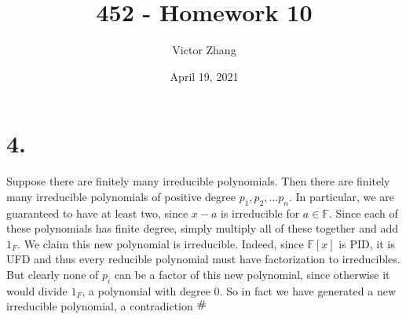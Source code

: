 \documentclass{article}
\title{452 - Homework 10}
\author{Victor Zhang}
\date{April 19, 2021}
\newcommand{\contra}{\raisebox{\depth}{\#}}
\begin{document}
\maketitle

\section*{4.}
Suppose there are finitely many irreducible polynomials. Then there are finitely many irreducible polynomials of positive degree $p_1, p_2, \dots p_n$. In particular, we are guaranteed to have at least two, since $x-a$ is irreducible for $a \in \mathbb{F}$. Since each of these polynomials has finite degree, simply multiply all of these together and add $1_F$. We claim this new polynomial is irreducible. Indeed, since $\mathbb{F}[x]$ is PID, it is UFD and thus every reducible polynomial must have factorization to irreducibles. But clearly none of $p_i$ can be a factor of this new polynomial, since otherwise it would divide $1_F$, a polynomial with degree 0. So in fact we have generated a new irreducible polynomial, a contradiction $\contra$
\end{document}
